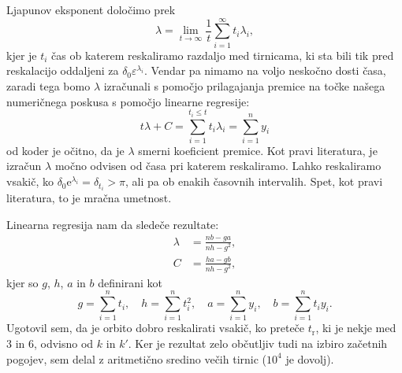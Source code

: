 \documentclass[a4paper, 12pt]{article}
\newcommand{\e}{
	\ensuremath{\varepsilon}
}
\begin{document}
Ljapunov eksponent dolo\v cimo prek
\begin{equation}
	\lambda = \lim_{t \to \infty} \frac{1}{t} \sum_{i = 1}^\infty t_i \lambda_i,
\end{equation}
kjer je $t_i$ \v cas ob katerem reskaliramo razdaljo med tirnicama, ki sta bili tik pred reskalacijo oddaljeni za
$\delta_0 \e^{\lambda_i}$. Vendar pa nimamo na voljo nesko\v cno dosti \v casa, zaradi tega bomo $\lambda$ izra\v cunali
s pomo\v cjo prilagajanja premice na to\v cke na\v sega numeri\v cnega poskusa s pomo\v cjo linearne regresije:
\begin{equation}
	t\lambda + C = \sum_{i = 1}^{t_i \leq t} t_i \lambda_i = \sum_{i = 1}^n y_i
\end{equation}
od koder je o\v citno, da je $\lambda$ smerni koeficient premice. Kot pravi literatura, je izra\v cun $\lambda$ mo\v cno
odvisen od \v casa pri katerem reskaliramo. Lahko reskaliramo vsaki\v c, ko $\delta_0 \mathrm{e}^{\lambda_i} = \delta_{t_i}
> \pi$, ali pa ob enakih \v casovnih intervalih. Spet, kot pravi literatura, to je mra\v cna umetnost.

Linearna regresija nam da slede\v ce rezultate:
\begin{align}
	\lambda &= \frac{nb - ga}{nh - g^2}, \\
	C &= \frac{ha - gb}{nh - g^2},
\end{align}
kjer so $g$, $h$, $a$ in $b$ definirani kot
\begin{equation}
	g = \sum_{i = 1}^n t_i,\quad h = \sum_{i = 1}^n t_i^2,\quad a = \sum_{i = 1}^n y_i,
	\quad b = \sum_{i = 1}^n t_i y_i.
\end{equation}
Ugotovil sem, da je orbito dobro reskalirati vsaki\v c, ko prete\v ce $t_\mathrm{r}$, ki je nekje med $3$ in $6$, odvisno
od $k$ in $k'$. Ker je rezultat zelo ob\v cutljiv tudi na izbiro za\v cetnih pogojev, sem delal z aritmeti\v cno sredino
ve\v cih tirnic ($10^4$ je dovolj).
\end{document}
